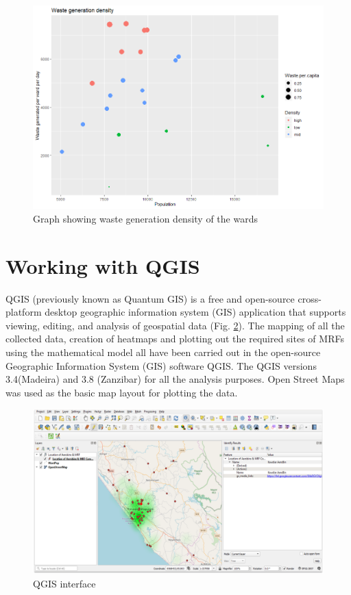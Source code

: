\documentclass[12pt,a4paper]{report}
\begin{document}
\begin{figure}[H]
	\centering
	\includegraphics[width=1\linewidth]{waste_gen_dens}
	\caption{Graph showing waste generation density of the wards}
	\label{fig:wastegendens}
\end{figure}

\section{Working with QGIS}
QGIS (previously known as Quantum GIS) is a free and open-source cross-platform desktop geographic information system (GIS) application that supports viewing, editing, and analysis of geospatial data (Fig. \ref{fig:qgisui}). The mapping of all the collected data, creation of heatmaps and plotting out the required sites of MRFs using the mathematical model all have been carried out in the open-source Geographic Information System (GIS)  software QGIS. The QGIS versions 3.4(Madeira) and 3.8 (Zanzibar) for all the analysis purposes. Open Street Maps was used as the basic map layout for plotting the data. 

\begin{figure}[H]
	\centering
	\includegraphics[width=1\linewidth]{qgis_ui}
	\caption{QGIS interface}
	\label{fig:qgisui}
\end{figure}
\end{document}
